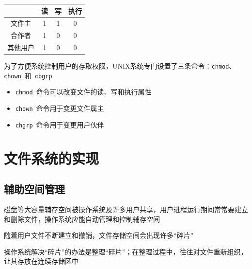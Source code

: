 \documentclass[cs4size,a4paper,10pt]{ctexart}
\begin{document}
	\begin{table}[H]
		\centering
		\begin{tabular}{|c|c|c|c|}
		\hline
			 & 读 & 写 & 执行 \\ \hline
		文件主  & 1 & 1 & 0  \\ \hline
		合作者  & 1 & 0 & 0  \\ \hline
		其他用户 & 1 & 0 & 0  \\ \hline
		\end{tabular}
	\end{table}

	为了方便系统控制用户的存取权限，UNIX系统专门设置了三条命令：\verb|chmod|、\verb|chown|\ 和\ \verb|cbgrp|
	\begin{itemize}
		\item \verb|chmod|\ 命令可以改变文件的读、写和执行属性
		\item \verb|chown|\ 命令用于变更文件属主
		\item \verb|chgrp|\ 命令用于变更用户伙伴
	\end{itemize}


	\section{文件系统的实现}

	\subsection{辅助空间管理}
	磁盘等大容量辅存空间被操作系统及许多用户共享，用户进程运行期间常常要建立和删除文件，操作系统应能自动管理和控制辅存空间

	随着用户文件不断建立和撤销，文件存储空间会出现许多“碎片”

	操作系统解决“碎片”的办法是整理“碎片”；在整理过程中，往往对文件重新组织，让其存放在连续存储区中
\end{document}
